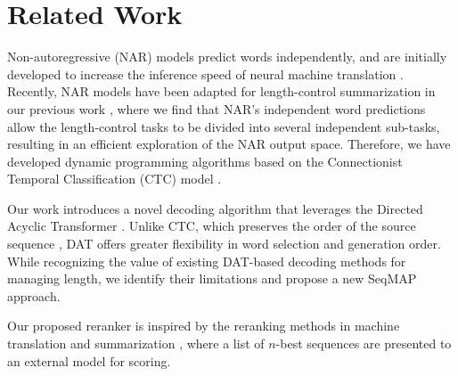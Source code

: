 \section{Related Work}
Non-autoregressive (NAR) models predict words independently, 
and are initially developed to increase the inference speed of neural machine translation \cite{gu2018nonautoregressive,lee-etal-2018-deterministic,qian2020glancing,gu-kong-2021-fully,huang-etal-2023-multilingual}.
Recently, NAR models have been adapted for length-control summarization in our previous work \cite{liu-etal-2022-learning,liucharacter}, where we find that NAR's independent word predictions allow the length-control tasks to be divided into several independent sub-tasks, resulting in an efficient exploration of the NAR output space. Therefore, we have developed dynamic programming algorithms based on the Connectionist Temporal Classification (CTC) model \cite{graves2006connectionist}.

Our work introduces a novel decoding algorithm that leverages the Directed Acyclic Transformer \cite[DAT,][]{huang2022directed}. Unlike CTC, which preserves the order of the source sequence \cite{chuang-etal-2021-investigating,shao2022}, DAT offers greater flexibility in word selection and generation order. While recognizing the value of existing DAT-based decoding methods \cite{shao-etal-2022-viterbi} for managing length, we identify their limitations and propose a new SeqMAP approach.

Our proposed reranker is inspired by the reranking methods in machine translation \cite{och-etal-2004-smorgasbord,lee-etal-2021-discriminative} and summarization \cite{ravaut-etal-2022-summareranker}, where a list of $n$-best sequences are presented to an external model for scoring.